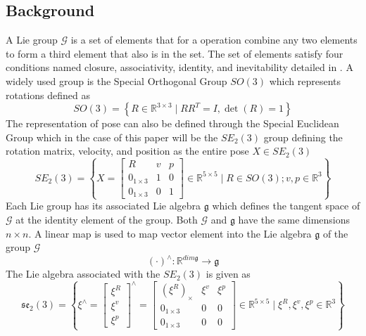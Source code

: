 \subsection{Background}
A Lie group $\mathcal{G}$ is a set of elements that for a operation combine any two elements to form a third element that also is in the set. The set of elements satisfy four conditions named closure, associativity, identity, and inevitability detailed in \cite{book}. A widely used group is the Special Orthogonal Group $SO(3)$ which represents rotations defined as \cite{book}
\begin{equation}
    SO(3)=\left\{R \in \mathbb{R}^{3 \times 3} \mid R R^T=I, \operatorname{det} (R)=1\right\}
    \label{eq: SO3 group}
\end{equation}
The representation of pose can also be defined through the Special Euclidean Group which in the case of this paper will be the $SE_2(3)$ group defining the rotation matrix, velocity, and position as the entire pose $X \in SE_2(3)$
\begin{equation}
    SE_2(3) = \left\{X = \begin{bmatrix}
    R & v & p\\
    0_{1 \times 3} & 1 & 0\\
    0_{1 \times 3} & 0 & 1
    \end{bmatrix} \in \mathbb{R}^{5 \times 5}
    \mid R \in SO(3); v, p \in \mathbb{R}^3\right\}
    \label{eq: SE3_2 group}
\end{equation}
Each Lie group has its associated Lie algebra $\mathfrak{g}$ which defines the tangent space of $\mathcal{G}$ at the identity element of the group. Both $\mathcal{G}$ and $\mathfrak{g}$ have the same dimensions $n \times n$. A linear map is used to map vector element into the Lie algebra $\mathfrak{g}$ of the group $\mathcal{G}$ \cite{Contact-Aided_Invarant_EKF}
\begin{equation}
    (\cdot)^{\wedge}: \mathbb{R}^{dim \mathfrak{g}} \rightarrow \mathfrak{g}
    \label{eq: linear map to g}
\end{equation}
The Lie algebra associated with the $SE_2(3)$ is given as 
\begin{equation}
    \mathfrak{s e}_2(3) =\left\{\xi^{\wedge} = 
    \begin{bmatrix}
         \xi^R \\
         \xi^v \\
         \xi^p
    \end{bmatrix}^{\wedge}
        =\begin{bmatrix}
    (\xi^R)_{\times} & \xi^v & \xi^p\\
    0_{1 \times 3} & 0 & 0\\
    0_{1 \times 3}  & 0 & 0
    \end{bmatrix} \in \mathbb{R}^{5 \times 5}
    \mid \xi^R, \xi^v, \xi^p \in \mathbb{R}^3\right\}
    \label{eq: se_2(3) lie algebra}
\end{equation}
